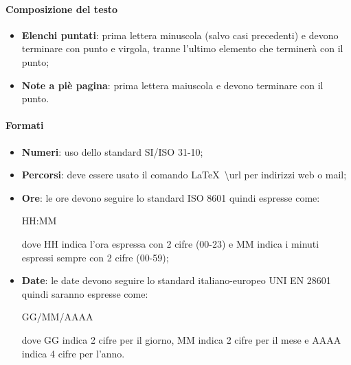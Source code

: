 \documentclass[../NormeDiProgetto.tex]{subfiles}
\begin{document}
				\paragraph{Composizione del testo}
					\begin{itemize}
						\item \textbf{Elenchi puntati}: prima lettera minuscola (salvo casi
						precedenti) e devono terminare con punto e virgola, tranne l'ultimo elemento
						che terminerà con il punto;
						\item \textbf{Note a piè pagina}: prima lettera maiuscola e devono terminare
						con il punto.
					\end{itemize}
				\paragraph{Formati}
					\begin{itemize}
						\item \textbf{Numeri}: uso dello standard SI/ISO 31-10; 
						\item \textbf{Percorsi}: deve essere usato il comando
						\LaTeX\ \textbackslash url per indirizzi web o mail;
						\item \textbf{Ore}: le ore devono seguire lo standard ISO 8601 quindi
						espresse come:\\
						\begin{center}
							HH:MM 
						\end{center}  
						dove HH indica l'ora espressa con 2 cifre (00-23) e MM indica i minuti
						espressi sempre con 2 cifre (00-59);
						\item \textbf{Date}: le date devono seguire lo standard italiano-europeo
						UNI EN 28601 quindi saranno espresse come:
						\begin{center}
							GG/MM/AAAA
						\end{center}  
						dove GG indica 2 cifre per il giorno, MM indica 2 cifre per il mese e AAAA indica 
						4 cifre per l'anno.
					\end{itemize}
\end{document}

